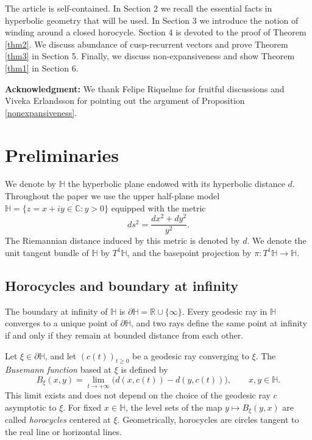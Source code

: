 \documentclass[a4paper,english,reqno]{amsart}
\renewcommand{\H}{\mathbb{H}}
\theoremstyle{definition}
\numberwithin{equation}{section}
\begin{document}
	The article is self-contained. In Section 2 we recall the essential facts in hyperbolic geometry that will be used. In Section 3 we introduce the notion of winding around a closed horocycle. Section 4 is devoted to the proof of Theorem \ref{thm2}. We discuss abundance of cusp-recurrent vectors and prove Theorem \ref{thm3} in Section 5. Finally, we discuss non-expansiveness and show Theorem \ref{thm1} in Section 6.
	

	 
	


\medskip

	\textbf{Acknowledgment:} We thank Felipe Riquelme for fruitful discussions and Viveka Erlandsson for pointing out the argument of Proposition \ref{nonexpansiveness}.
		
	\section{Preliminaries}
	
	We denote by $\mathbb H$ the hyperbolic plane endowed with its hyperbolic distance $d$. 
	Throughout the paper we use the upper half-plane model $\mathbb H=\{z=x+iy\in\mathbb C : y>0\} $
	equipped with the metric
	\[
	ds^2=\frac{dx^2+dy^2}{y^2}.
	\]
	The Riemannian distance induced by this metric is denoted by $d$. We denote the unit tangent bundle of $\H$ by $T^1\mathbb H$, and the basepoint projection by $\pi:T^1\mathbb H\to\mathbb H$.
	
	\medskip
	
	\subsection{Horocycles and boundary at infinity}
	
	The boundary at infinity of $\mathbb H$ is $\partial\mathbb H=\mathbb R\cup\{\infty\}$.
	Every geodesic ray in $\mathbb H$ converges to a unique point of $\partial\mathbb H$, and two rays define the same point at infinity if and only if they remain at bounded distance from each other.
	
	\medskip
	
	Let $\xi\in\partial\mathbb H$, and let $(c(t))_{t\ge0}$ be a geodesic ray converging to $\xi$. 
	The \emph{Busemann function} based at $\xi$ is defined by
	\[
	B_\xi(x,y)
	=
	\lim_{t\to+\infty}
	\big(
	d(x,c(t)) - d(y,c(t))
	\big),
	\qquad x,y\in\mathbb H.
	\]
	This limit exists and does not depend on the choice of the geodesic ray $c$ asymptotic to $\xi$. 
	For fixed $x\in\mathbb H$, the level sets of the map $y\mapsto B_\xi(y,x)$ are called \emph{horocycles} centered at $\xi$. Geometrically, horocycles are circles tangent to the real line or horizontal lines.
	
\end{document}
